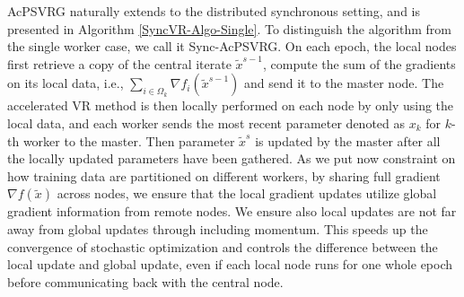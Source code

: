 \documentclass[conference]{IEEEtran}
\theoremstyle{definition}
\theoremstyle{remark}
\begin{document}
AcPSVRG naturally extends to the distributed synchronous
setting,  and  is  presented  in  Algorithm  \ref{SyncVR-Algo-Single}.  To  distinguish  the
algorithm from the single worker case, we call it Sync-AcPSVRG. On  each  epoch,  the  local  nodes  first  retrieve  a  copy of  the  central  iterate $\widetilde{x}^{s-1}$, compute the sum of the gradients on its local data, i.e., $\sum_{i\in\Omega_k}{\nabla f_i{(\widetilde{x}^{s-1})}}$ and send it to the master node. The accelerated VR method is then locally performed on each node by only using the local data, and each worker sends the most recent parameter denoted as ${x}_k$ for $k$-th worker to the master. Then parameter $\widetilde{x}^s$ is updated by the master after all the locally updated parameters have been gathered. As we put now constraint on how training data are partitioned on different workers, by sharing full gradient $\nabla f(\widetilde{x})$ across nodes, we ensure  that  the  local  gradient  updates  utilize  global  gradient information from remote nodes. We ensure also local updates are not far away from global updates through including momentum. This speeds up the convergence of stochastic optimization and controls the difference between the local update and global update, even if each local  node  runs  for  one  whole  epoch  before  communicating back with the central node. 
\end{document}
